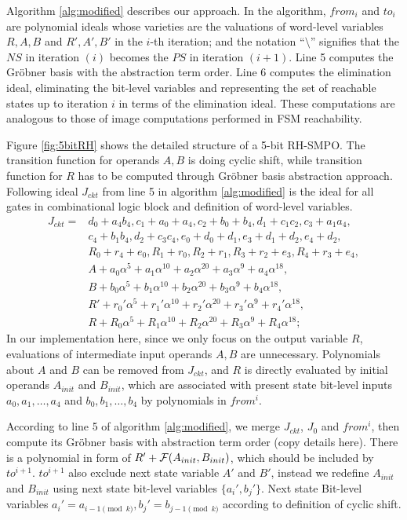 Algorithm
\ref{alg:modified} describes our approach.  In the algorithm, $from_i$
and $to_i$ are polynomial ideals whose varieties are the valuations of
word-level variables $R, A, B$ and $R',A',B'$ in the $i$-th iteration;
and the notation ``$\setminus$'' signifies that the $NS$ in iteration
$(i)$ becomes the $PS$ in iteration $(i+1)$. Line 5 computes the Gr\"obner 
basis with the abstraction term order.  Line 6 computes the elimination 
ideal, eliminating the bit-level variables and representing the set of 
reachable states up to iteration $i$ in terms of the elimination ideal. 
These computations are analogous to those of image computations performed in FSM reachability. 
\begin{Example}
\label{ex:RHSMPO}
Figure \ref{fig:5bitRH} shows the detailed structure of a 5-bit RH-SMPO. The transition function for
operands $A,B$ is doing cyclic shift, while transition function for $R$ has to be computed through Gr\"obner basis
abstraction approach. Following ideal $J_{ckt}$ from line 5 in algorithm \ref{alg:modified} is the ideal for 
all gates in combinational logic block and definition of word-level variables.
\begin{align}
J_{ckt} = & d_0+a_4b_4, c_1+a_0+a_4, c_2+b_0+b_4, d_1+c_1c_2, c_3+a_1a_4,\nonumber\\
& c_4+b_1b_4, d_2+c_3c_4, e_0+d_0+d_1, e_3+d_1+d_2, e_4+d_2, \nonumber\\
& R_0+r_4+e_0, R_1+r_0, R_2+r_1, R_3+r_2+e_3, R_4+r_3+e_4,\nonumber\\
& A+a_0\alpha^5+a_1\alpha^{10}+a_2\alpha^{20}+a_3\alpha^9+a_4\alpha^{18},\nonumber\\
		 & B+b_0\alpha^5+b_1\alpha^{10}+b_2\alpha^{20}+b_3\alpha^9+b_4\alpha^{18},\nonumber\\
		 & R'+r_0'\alpha^5+r_1'\alpha^{10}+r_2'\alpha^{20}+r_3'\alpha^9+r_4'\alpha^{18},\nonumber\\
		 & R+R_0\alpha^5+R_1\alpha^{10}+R_2\alpha^{20}+R_3\alpha^9+R_4\alpha^{18};\nonumber
\end{align}
In our implementation here, since we only focus on the output variable $R$, evaluations of intermediate input 
operands $A, B$ are unnecessary. Polynomials about $A$ and $B$ can be removed from $J_{ckt}$, and $R$ is directly
evaluated by initial operands $A_{init}$ and $B_{init}$, which are associated with present state bit-level inputs
$a_0,a_1,\dots,a_4$ and $b_0,b_1,\dots,b_4$ by polynomials in $from^i$.

According to line 5 of algorithm \ref{alg:modified}, we merge $J_{ckt}$, $J_0$ and $from^i$, then compute its
Gr\"obner basis with abstraction term order (copy details here). There is a polynomial in form of $R'+{\mathcal{F}}(A_{init},B_{init})$,
which should be included by $to^{i+1}$. $to^{i+1}$ also exclude next state variable $A'$ and $B'$, instead we 
redefine $A_{init}$ and $B_{init}$ using next state bit-level variables $\{a_i', b_j'\}$. Next state Bit-level variables
$a_i' = a_{i-1\pmod k}, b_j' = b_{j-1\pmod k}$ according to definition of cyclic shift.


\end{Example}

